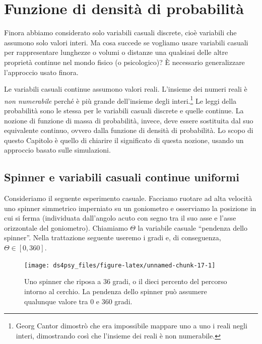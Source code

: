\documentclass[
  11pt,
]{krantz}
\theoremstyle{definition}
\theoremstyle{definition}
\theoremstyle{definition}
\theoremstyle{definition}
\theoremstyle{remark}
\begin{document}
\hypertarget{chapter-intro-density-function}{%
\chapter{Funzione di densità di probabilità}\label{chapter-intro-density-function}}

Finora abbiamo considerato solo variabili casuali discrete, cioè variabili che assumono solo valori interi. Ma cosa succede se vogliamo usare variabili casuali per rappresentare lunghezze o volumi o distanze una qualsiasi delle altre proprietà continue nel mondo fisico (o psicologico)? È necessario generalizzare l'approccio usato finora.

Le variabili casuali continue assumono valori reali. L'insieme dei numeri reali è \emph{non numerabile} perché è più grande dell'insieme degli interi.\footnote{Georg Cantor dimostrò che era impossibile mappare uno a uno i reali negli interi, dimostrando così che l'insieme dei reali è non numerabile.} Le leggi della probabilità sono le stessa per le variabili casuali discrete e quelle continue. La nozione di funzione di massa di probabilità, invece, deve essere sostituita dal suo equivalente continuo, ovvero dalla funzione di densità di probabilità. Lo scopo di questo Capitolo è quello di chiarire il significato di questa nozione, usando un approccio basato sulle simulazioni.

\hypertarget{spinner-e-variabili-casuali-continue-uniformi}{%
\section{Spinner e variabili casuali continue uniformi}\label{spinner-e-variabili-casuali-continue-uniformi}}

Consideriamo il seguente esperimento casuale. Facciamo ruotare ad alta velocità uno spinner simmetrico imperniato su un goniometro e osserviamo la posizione in cui si ferma (individuata dall'angolo acuto con segno tra il suo asse e l'asse orizzontale del goniometro). Chiamiamo \(\Theta\) la variabile casuale ``pendenza dello spinner''. Nella trattazione seguente useremo i gradi e, di conseguenza, \(\Theta \in [0, 360]\).

\begin{figure}[h]

{\centering \texttt{[image: ds4psy\_files/figure-latex/unnamed-chunk-17-1]} 

}

\caption{Uno spinner che riposa a 36 gradi, o il dieci percento del percorso intorno al cerchio. La pendenza dello spinner può assumere qualunque valore tra 0 e 360 gradi.}\label{fig:unnamed-chunk-17}
\end{figure}
\end{document}

